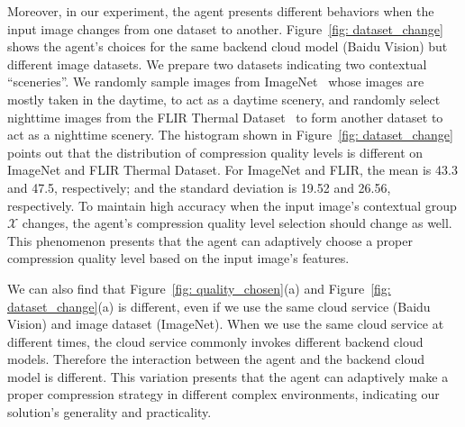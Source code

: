 Moreover, in our experiment, the agent presents different behaviors when the input image changes from one dataset to another. Figure~\ref{fig: dataset_change} shows the agent's choices for the same backend cloud model (Baidu Vision) but different image datasets. We prepare two datasets indicating two contextual ``sceneries''. We randomly sample images from ImageNet~\cite{ImageNet} whose images are mostly taken in the daytime, to act as a daytime scenery, and randomly select nighttime images from the FLIR Thermal Dataset~\cite{FLIR} to form another dataset to act as a nighttime scenery. \textcolor{revise}{The histogram shown in Figure~\ref{fig: dataset_change} points out that the distribution of compression quality levels is different on ImageNet and FLIR Thermal Dataset. For ImageNet and FLIR, the mean is 43.3 and 47.5, respectively; and the standard deviation is 19.52 and 26.56, respectively.} To maintain high accuracy when the input image's contextual group $ \mathcal{X} $ changes, the agent's compression quality level selection should change as well. This phenomenon presents that the agent can adaptively choose a proper compression quality level based on the input image's features.

\textcolor{revise}{We can also find that Figure~\ref{fig: quality_chosen}(a) and Figure~\ref{fig: dataset_change}(a) is different, even if we use the same cloud service (Baidu Vision) and image dataset (ImageNet). When we use the same cloud service at different times, the cloud service commonly invokes different backend cloud models. Therefore the interaction between the agent and the backend cloud model is different. This variation presents that the agent can adaptively make a proper compression strategy in different complex environments, indicating our solution's generality and practicality.} %




